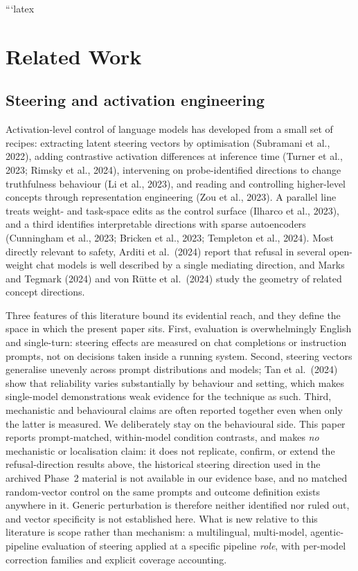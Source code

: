 ```latex
\section{Related Work}

\subsection{Steering and activation engineering}

Activation-level control of language models has developed from a small set of
recipes: extracting latent steering vectors by optimisation
(Subramani et al., 2022), adding contrastive activation differences at inference
time (Turner et al., 2023; Rimsky et al., 2024), intervening on
probe-identified directions to change truthfulness behaviour
(Li et al., 2023), and reading and controlling higher-level concepts through
representation engineering (Zou et al., 2023). A parallel line treats weight-
and task-space edits as the control surface (Ilharco et al., 2023), and a third
identifies interpretable directions with sparse autoencoders
(Cunningham et al., 2023; Bricken et al., 2023; Templeton et al., 2024). Most
directly relevant to safety, Arditi et al.\ (2024) report that refusal in
several open-weight chat models is well described by a single mediating
direction, and Marks and Tegmark (2024) and von R\"utte et al.\ (2024) study
the geometry of related concept directions.

Three features of this literature bound its evidential reach, and they define
the space in which the present paper sits. First, evaluation is overwhelmingly
English and single-turn: steering effects are measured on chat completions or
instruction prompts, not on decisions taken inside a running system. Second,
steering vectors generalise unevenly across prompt distributions and models;
Tan et al.\ (2024) show that reliability varies substantially by behaviour and
setting, which makes single-model demonstrations weak evidence for the technique
as such. Third, mechanistic and behavioural claims are often reported together
even when only the latter is measured. We deliberately stay on the behavioural
side. This paper reports prompt-matched, within-model condition contrasts, and
makes \emph{no} mechanistic or localisation claim: it does not replicate,
confirm, or extend the refusal-direction results above, the historical steering
direction used in the archived Phase~2 material is not available in our evidence
base, and no matched random-vector control on the same prompts and outcome
definition exists anywhere in it. Generic perturbation is therefore neither
identified nor ruled out, and vector specificity is not established here. What
is new relative to this literature is scope rather than mechanism: a
multilingual, multi-model, agentic-pipeline evaluation of steering applied at a
specific pipeline \emph{role}, with per-model correction families and explicit
coverage accounting.

